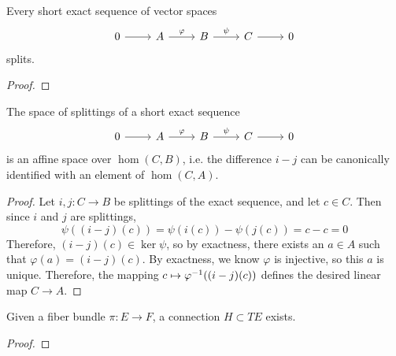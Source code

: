 %
\begin{lem}
Every short exact sequence of vector spaces
\[\begin{tikzcd}
0 \ar[r] & A \ar[r, "\varphi"] & B \ar[r, "\psi"] & C \ar[r] & 0
\end{tikzcd}\]
splits.
\end{lem}
%
\begin{proof} %

\end{proof}
%
\begin{lem}
The space of splittings of a short exact sequence
\[\begin{tikzcd}
0 \ar[r] & A \ar[r, "\varphi"] & B \ar[r, "\psi"] & C \ar[r] & 0
\end{tikzcd}\]
is an affine space over $\hom(C,B)$,
i.e. the difference $i - j$ can be canonically identified with an element of
$\hom(C,A)$.
\end{lem}
%
\begin{proof}
Let $i,j : C \to B$ be splittings of the exact sequence, and let
$c \in C$. Then since $i$ and $j$ are splittings,
\[
\psi((i-j)(c)) = \psi(i(c)) - \psi(j(c)) = c - c = 0
\]
Therefore, $(i-j)(c) \in \ker\psi$, so by exactness, there exists an $a \in A$
such that $\varphi(a) = (i-j)(c)$. By exactness, we know $\varphi$ is injective,
so this $a$ is unique. Therefore, the mapping $c \mapsto \varphi^{-1}((i-j)(c))$
defines the desired linear map $C \to A$.
\end{proof}
%
\begin{prop}
Given a fiber bundle $\pi : E \to F$, a connection $H \subset TE$ exists.
\end{prop}
%
\begin{proof}%

\end{proof}
%

